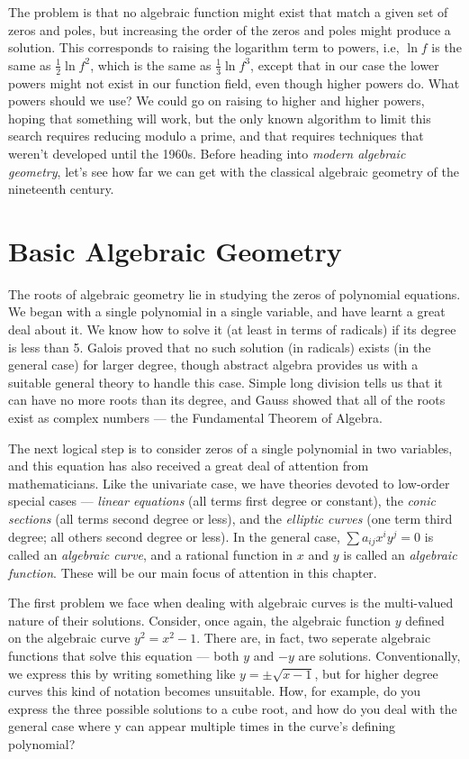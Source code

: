 The problem is that no algebraic function might exist that match a
given set of zeros and poles, but increasing the order of the zeros
and poles might produce a solution.  This corresponds to raising the
logarithm term to powers, i.e, $\ln f$ is the same as $\frac{1}{2} \ln
f^2$, which is the same as $\frac{1}{3} \ln f^3$, except that in our
case the lower powers might not exist in our function field, even
though higher powers do.  What powers should we use?  We could go on
raising to higher and higher powers, hoping that something will work,
but the only known algorithm to limit this search requires reducing
modulo a prime, and that requires techniques that weren't developed
until the 1960s.  Before heading into {\it modern algebraic geometry},
let's see how far we can get with the classical algebraic geometry of
the nineteenth century.

\section{Basic Algebraic Geometry}

The roots of algebraic geometry lie in studying the zeros of
polynomial equations.  We began with a single polynomial in a single
variable, and have learnt a great deal about it.  We know how to solve
it (at least in terms of radicals) if its degree is less than 5.
Galois proved that no such solution (in radicals) exists (in the
general case) for larger degree, though abstract algebra provides us
with a suitable general theory to handle this case.  Simple long
division tells us that it can have no more roots than its degree, and
Gauss showed that all of the roots exist as complex numbers --- the
Fundamental Theorem of Algebra.

The next logical step is to consider zeros of a single polynomial in
two variables, and this equation has also received a great deal of
attention from mathematicians.  Like the univariate case, we have
theories devoted to low-order special cases --- {\it linear equations}
(all terms first degree or constant), the {\it conic sections} (all
terms second degree or less), and the {\it elliptic curves} (one term
third degree; all others second degree or less).  In the general case,
$\sum a_{ij} x^i y^j = 0$ is called an {\it algebraic curve}, and a
rational function in $x$ and $y$ is called an {\it algebraic
function}.  These will be our main focus of attention in this chapter.

The first problem we face when dealing with algebraic curves is the
multi-valued nature of their solutions.  Consider, once again, the
algebraic function $y$ defined on the algebraic curve $y^2 = x^2 - 1$.
There are, in fact, two seperate algebraic functions that solve this
equation --- both $y$ and $-y$ are solutions.  Conventionally, we
express this by writing something like $y = \pm\sqrt{x-1}$, but for
higher degree curves this kind of notation becomes unsuitable.  How,
for example, do you express the three possible solutions to a cube
root, and how do you deal with the general case where y can appear
multiple times in the curve's defining polynomial?

